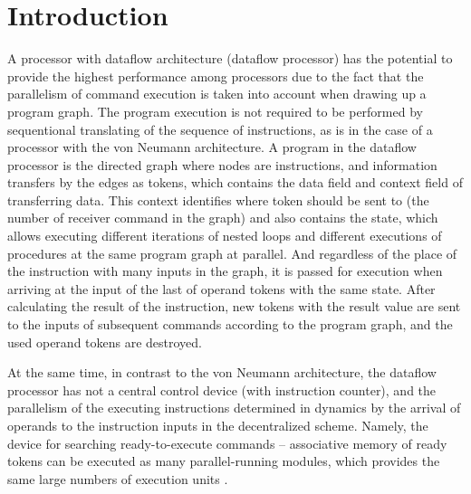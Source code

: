 \documentclass[
11pt,%
tightenlines,%
twoside,%
onecolumn,%
nofloats,%
nobibnotes,%
nofootinbib,%
superscriptaddress,%
noshowpacs,%
centertags]%
{revtex4}
\begin{document}


\maketitle

\section{Introduction}

A processor with dataflow architecture (dataflow processor) has the potential to provide the highest performance among processors due to the fact that the parallelism of command execution is taken into account when drawing up a program graph.
The program execution is not required to be performed by sequentional translating of the sequence of instructions, as is in the case of a processor with the von Neumann architecture.
A program in the dataflow processor is the directed graph where nodes are instructions, and information transfers by the edges as tokens, which contains the data field and context field of transferring data.
This context identifies where token should be sent to (the number of receiver command in the graph) and also contains the state, which allows executing different iterations of nested loops and different executions of procedures at the same program graph at parallel.
And regardless of the place of the instruction with many inputs in the graph, it is passed for execution when arriving at the input of the last of operand tokens with the same state.
After calculating the result of the instruction, new tokens with the result value are sent to the inputs of subsequent commands according to the program graph, and the used operand tokens are destroyed.

At the same time, in contrast to the von Neumann architecture, the dataflow processor has not a central control device (with instruction counter), and the parallelism of the executing instructions determined in dynamics by the arrival of operands to the instruction inputs in the decentralized scheme.
Namely, the device for searching ready-to-execute commands -- associative memory of ready tokens can be executed as many parallel-running modules, which provides the same large numbers of execution units \cite{fine-grained-prl}.
\end{document}
